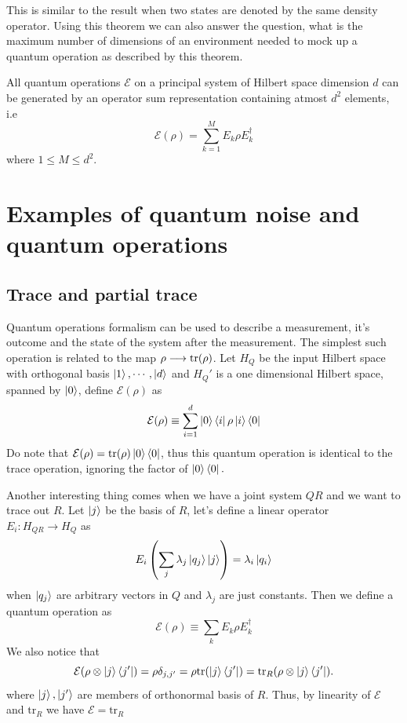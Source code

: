 This is similar to the result when two states are denoted by the same density operator. Using this theorem we can also answer the question, what is the maximum number of dimensions of an environment needed to mock up a quantum operation as described by this theorem.

\begin{theorem}
    All quantum operations $\mathcal{E}$ on a principal system of Hilbert space dimension $d$ can be generated by an operator sum representation containing atmost $d^2$ elements, i.e
    \begin{equation}
        \mathcal{E}(\rho) = \sum_{k=1}^M E_k\rho E_k^\dag
    \end{equation}
    where $1\leq M\leq d^2$.
\end{theorem}

\section{Examples of quantum noise and quantum operations}
\subsection{Trace and partial trace}
Quantum operations formalism can be used to describe a measurement, it's outcome and the state of the system after the measurement. The simplest such operation is related to the map $\rho \longrightarrow \text{tr}(\rho)$. Let $H_Q$ be the input Hilbert space with orthogonal basis $\ket{1}, \cdots, \ket{d}$ and $H_Q'$ is a one dimensional Hilbert space, spanned by $\ket{0}$, define $\mathcal{E}(\rho)$ as
\begin{equation}
    \mathcal{E}(\rho) \equiv \sum_{i=1}^{d} \ket{0} \bra{i} \rho \ket{i} \bra{0}
\end{equation}
Do note that $\mathcal{E}(\rho) = \text{tr}(\rho)\ket{0}\bra{0}$, thus this quantum operation is identical to the trace operation, ignoring the factor of $\ket{0}\bra{0}.$

Another interesting thing comes when we have a joint system $QR$ and we want to trace out $R$. Let $\ket{j}$ be the basis of $R$, let's define a linear operator $E_i: H_{QR} \longrightarrow H_Q$ as
\begin{equation}
    E_i\left( \sum_j \lambda_j \ket{q_j} \ket{j} \right) = \lambda_i \ket{q_i}
\end{equation}
when $\ket{q_j}$ are arbitrary vectors in $Q$ and $\lambda_j$ are just constants. Then we define a quantum operation as
\begin{equation}
    \mathcal{E}(\rho) \equiv \sum_k E_k\rho E_k^\dag
\end{equation}
We also notice that
\begin{equation}
    \mathcal{E}(\rho \otimes \ket{j}\bra{j'}) = \rho \delta_{j, j'} = \rho \text{tr}(\ket{j}\bra{j'}) = \text{tr}_R(\rho \otimes \ket{j}\bra{j'}).
\end{equation}
where $\ket{j}, \ket{j'}$ are members of orthonormal basis of $R$. Thus, by linearity of $\mathcal{E}$ and $\text{tr}_R$ we have $\mathcal{E} = \text{tr}_R$

